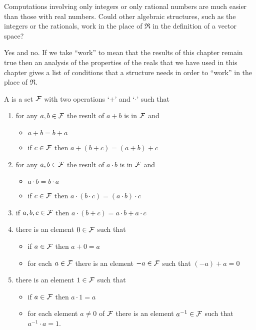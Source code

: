 Computations involving only integers or only rational numbers are much
easier than those with real numbers.
Could other algebraic structures, such as the integers or the rationals,
work in the
place of \( \Re \) in the definition of a vector space?

Yes and no.
If we take ``work'' to mean that the results of this chapter
remain true
then an analysis of the properties of the reals that we have
used in this chapter gives a list of conditions that a structure
needs in order to ``work'' in the place of $\Re$.

\begin{definition}
A  is a set 
\( \mathcal{F} \) with two operations
`\( + \)'
and `\( \cdot \)' such that
\begin{enumerate}
   \item for any \( a,b\in\mathcal{F} \) the result of \( a+b \) is in \( \mathcal{F} \) and
      \begin{itemize}
         \item \( a+b=b+a \)
         \item if \( c\in\mathcal{F} \) then \( a+(b+c)=(a+b)+c \)
      \end{itemize}
   \item for any \( a,b\in\mathcal{F} \) the result of \( a\cdot b \) is in \( \mathcal{F} \) and
      \begin{itemize}
         \item \( a\cdot b=b\cdot a \)
         \item if \( c\in\mathcal{F} \) then \( a\cdot (b\cdot c)=(a\cdot b)\cdot c \)
      \end{itemize}
   \item if \( a,b,c\in\mathcal{F} \) then \( a\cdot (b+c)=a\cdot b+a\cdot c \)
   \item there is an element \( 0\in\mathcal{F} \) such that
      \begin{itemize}
         \item if \( a\in\mathcal{F} \) then \( a+0=a \)
         \item for each \( a\in\mathcal{F} \) there is an element \( -a\in\mathcal{F} \)
                such that \( (-a)+a=0 \)
      \end{itemize}
   \item there is an element \( 1\in\mathcal{F} \) such that
      \begin{itemize}
         \item if \( a\in\mathcal{F} \) then \( a\cdot 1=a \)
         \item for each element \( a\neq 0 \) of \( \mathcal{F} \)
                there is an element \( a^{-1}\in\mathcal{F} \)
                such that \( a^{-1}\cdot a=1 \).
      \end{itemize}
\end{enumerate}
\end{definition}

